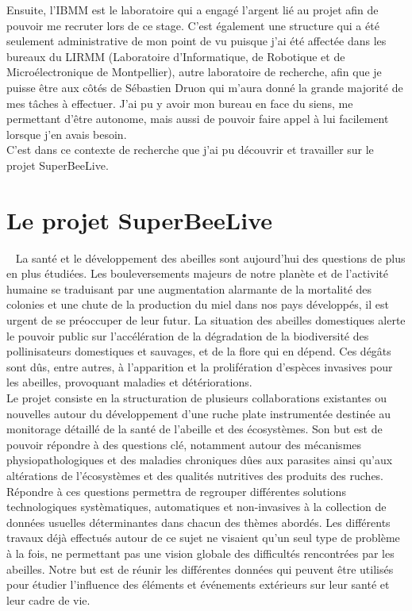 \documentclass[11pt,french,a4paper]{report}
\begin{document}
Ensuite, l'IBMM est le laboratoire qui a engagé l'argent lié au projet afin de pouvoir me recruter lors de ce stage. 
C'est également une structure qui a été seulement administrative de mon point de vu puisque j'ai été affectée dans 
les bureaux du LIRMM (Laboratoire d'Informatique, de Robotique et de Microélectronique de Montpellier), autre laboratoire de 
recherche, afin que je puisse être aux côtés de Sébastien Druon qui m'aura donné la grande majorité de mes tâches à effectuer. 
J'ai pu y avoir mon bureau en face du siens, me permettant d'être autonome, mais aussi de pouvoir faire
appel à lui facilement lorsque j'en avais besoin.\\

C'est dans ce contexte de recherche que j'ai pu découvrir et travailler sur le projet SuperBeeLive. \\ 


\section{Le projet SuperBeeLive}
 
La santé et le développement des abeilles sont aujourd’hui des questions de plus en plus étudiées. Les bouleversements
majeurs de notre planète et de l’activité humaine se traduisant par une augmentation alarmante de la mortalité
des colonies et une chute de la production du miel dans nos pays développés, il est urgent de se préoccuper de leur futur. 
La situation des abeilles domestiques alerte le pouvoir public sur l’accélération de la dégradation de la biodiversité des 
pollinisateurs domestiques et sauvages, et de la flore qui en dépend. Ces dégâts sont dûs, entre autres, à l’apparition 
et la prolifération d’espèces invasives pour les abeilles, provoquant maladies et détériorations. \\ 

Le projet consiste en la structuration de plusieurs collaborations existantes ou nouvelles autour du développement 
d’une ruche plate instrumentée destinée au monitorage détaillé de la santé de l’abeille et des écosystèmes. Son but est de
pouvoir répondre à des questions clé, notamment autour des mécanismes physiopathologiques et des maladies chroniques 
dûes aux parasites ainsi qu’aux altérations de l’écosystèmes et des qualités nutritives des produits des ruches. \\
Répondre à ces questions permettra de regrouper différentes solutions technologiques systèmatiques, 
automatiques et non-invasives à la collection de données usuelles déterminantes dans chacun des thèmes abordés.
Les différents travaux déjà effectués autour de ce sujet ne visaient qu’un seul type de problème à la fois, 
ne permettant pas une vision globale des difficultés rencontrées par les abeilles. Notre but est de réunir les différentes
données qui peuvent être utilisés pour étudier l’influence des éléments et événements extérieurs sur leur santé et leur cadre de vie.\\
\end{document}
